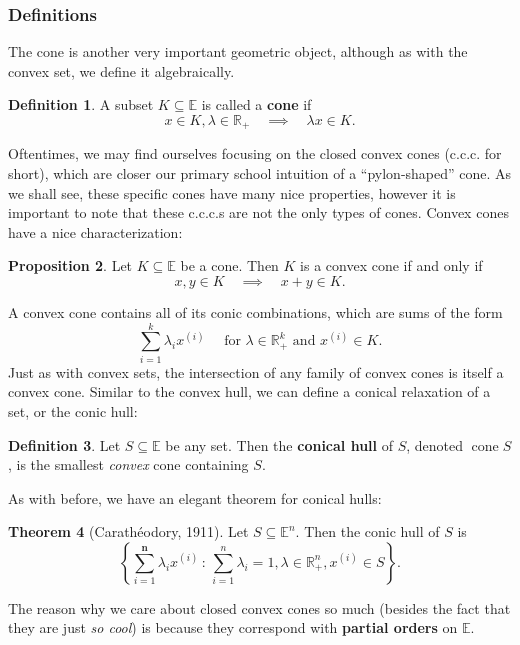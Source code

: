 \documentclass[11pt]{article}
\numberwithin{equation}{section}
\theoremstyle{definition}
\newtheorem{theorem}{Theorem}[section]
\newtheorem{proposition}[theorem]{Proposition}
\newtheorem{definition}[theorem]{Definition}%
\newcommand{\bE}{\mathbb{E}}
\newcommand{\bR}{\mathbb{R}}
\newcommand{\AND}{\text{ and }}
\newcommand{\FOR}{\text{ for }}
\newcommand{\set}[2]{\left\{#1\,:\,#2\right\}}
\newcommand{\cone}{\operatorname{cone}}
\begin{document}
\subsubsection{Definitions}
The cone is another very important geometric object, although as with the convex set, we define it algebraically.
\begin{definition}
    A subset $K\subseteq\bE$ is called a \textbf{cone} if
    \begin{equation}
        x\in K, \lambda\in\bR_+\quad\implies\quad \lambda x\in K.
    \end{equation}
\end{definition}
Oftentimes, we may find ourselves focusing on the closed convex cones (c.c.c. for short), which are closer our primary school intuition of a ``pylon-shaped'' cone. As we shall see, these specific cones have many nice properties, however it is important to note that these c.c.c.s are not the only types of cones. Convex cones have a nice characterization:
\begin{proposition}
    Let $K\subseteq\bE$ be a cone. Then $K$ is a convex cone if and only if
    \begin{equation}
        x, y\in K\quad\implies\quad x+y\in K.
    \end{equation}
\end{proposition}
A convex cone contains all of its conic combinations, which are sums of the form
\begin{equation}
    \sum_{i=1}^k\lambda_ix^{(i)}
\quad\FOR \lambda\in\bR^k_+ \AND x^{(i)}\in K.
\end{equation}
Just as with convex sets, the intersection of any family of convex cones is itself a convex cone. Similar to the convex hull, we can define a conical relaxation of a set, or the conic hull:
\begin{definition}
    Let $S\subseteq\bE$ be any set. Then the \textbf{conical hull} of $S$, denoted $\cone S$, is the smallest \textit{convex} cone containing $S$.
\end{definition}
As with before, we have an elegant theorem for conical hulls:
\begin{theorem}[Carath\'eodory, 1911]
    \label{thmcaratheodory2}%
    Let $S\subseteq\bE^n$. Then the conic hull of $S$ is
    \begin{equation}
        \label{thmcaratheodory2eq}
        \set{\sum_{i=1}^{\mathbf{n}}\lambda_ix^{(i)}}{ \sum_{i=1}^{n}\lambda_i=1, \lambda\in \bR_+^{n}, x^{(i)}\in S}.
    \end{equation}
\end{theorem}
The reason why we care about closed convex cones so much (besides the fact that they are just \textit{so cool}) is because they correspond with \textbf{partial orders} on $\bE$.
\end{document}
